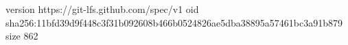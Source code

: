 version https://git-lfs.github.com/spec/v1
oid sha256:11bfd39d9f448c3f31b092608b466b0524826ae5dba38895a57461bc3a91b879
size 862
